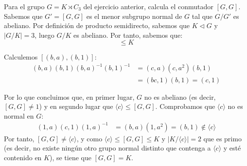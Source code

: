 \documentclass[12pt]{article}
\begin{document}
    \begin{ejercicio}
        Para el grupo $G = K \rtimes C_3$ del ejercicio anterior, calcula el conmutador $[G, G]$.\\

        Sabemos que $G' = [G, G]$ es el menor subgrupo normal de $G$ tal que $G/G'$ es abeliano. Por definición de producto semidirecto, sabemos que $K \lhd G$ y $|G/K| = 3$, luego $G/K$ es abeliano. Por tanto, sabemos que:
        \begin{equation*}
            [G, G] \leq K
        \end{equation*}

        Calculemos $[(b, a), (b, 1)]$:
        \begin{align*}
            (b, a)(b, 1)(b, a)^{-1} (b, 1)^{-1} & = (c, a)(c, a^2)(b, 1)\\
            & = (bc, 1)(b, 1) = (c, 1)
        \end{align*}

        Por lo que concluimos que, en primer lugar, $G$ no es abeliano (es decir, $[G, G] \neq 1$) y en segundo lugar que $\langle c \rangle \leq [G, G]$.
        Comprobamos que $\langle c \rangle$ no es normal en $G$:
        \begin{align*}
            (1, a)(c, 1)(1, a)^{-1} & = (b, a)(1, a^2) = (b, 1) \not\in \langle c \rangle
        \end{align*}
        Por tanto, $[G, G] \neq \langle c \rangle$, y como $\langle c \rangle \leq [G, G] \leq K$ y $|K/\langle c \rangle| = 2$ que es primo (es decir, no existe ningún otro grupo normal distinto que contenga a $\langle c \rangle$ y esté contenido en $K$), se tiene que $[G, G] = K$.
    \end{ejercicio}
\end{document}
